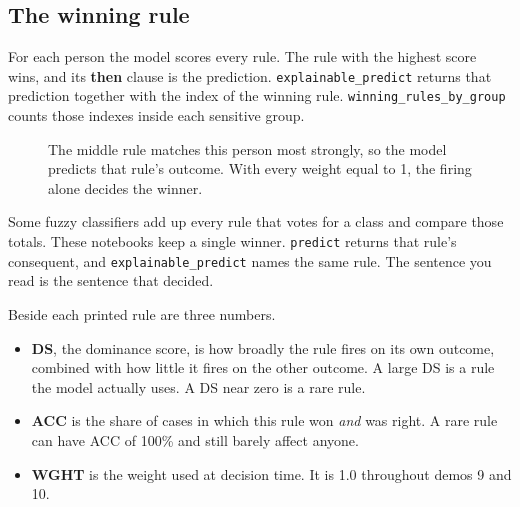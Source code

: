 \documentclass[11pt]{article}
\newcommand{\fn}[1]{\texttt{\small #1}}
\begin{document}
\subsection{The winning rule}

For each person the model scores every rule. The rule with the highest score wins, and its \textbf{then} clause is the prediction. \fn{explainable\_predict} returns that prediction together with the index of the winning rule. \fn{winning\_rules\_by\_group} counts those indexes inside each sensitive group.

\begin{figure}[H]
\centering
{}
\caption{The middle rule matches this person most strongly, so the model predicts that rule's outcome. With every weight equal to 1, the firing alone decides the winner.}
\end{figure}

Some fuzzy classifiers add up every rule that votes for a class and compare those totals. These notebooks keep a single winner. \fn{predict} returns that rule's consequent, and \fn{explainable\_predict} names the same rule. The sentence you read is the sentence that decided.

Beside each printed rule are three numbers.

\begin{itemize}
  \item \textbf{DS}, the dominance score, is how broadly the rule fires on its own outcome, combined with how little it fires on the other outcome. A large DS is a rule the model actually uses. A DS near zero is a rare rule.
  \item \textbf{ACC} is the share of cases in which this rule won \emph{and} was right. A rare rule can have ACC of 100\% and still barely affect anyone.
  \item \textbf{WGHT} is the weight used at decision time. It is 1.0 throughout demos 9 and 10.
\end{itemize}
\end{document}
